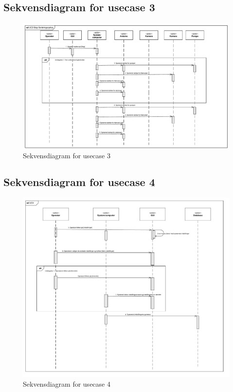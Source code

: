 \subsection{Sekvensdiagram for usecase 3} 
\begin{figure}[H]
	\centering
	\includegraphics[width=1\textwidth]{pdf/UC3_cropped.pdf}
	\caption{Sekvensdiagram for usecase 3}
	\label{fig:uc1}
\end{figure}

\subsection{Sekvensdiagram for usecase 4} 
\begin{figure}[H]
	\centering
	\includegraphics[width=1\textwidth]{pdf/UC4_cropped.pdf}
	\caption{Sekvensdiagram for usecase 4}
	\label{fig:uc1}
\end{figure}

